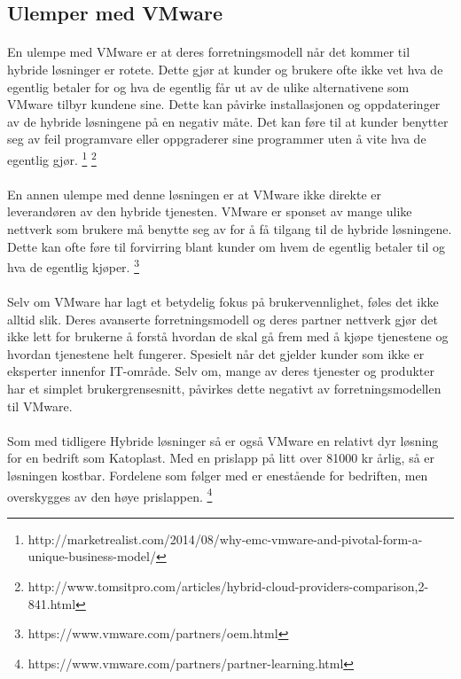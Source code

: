 \subsection{Ulemper med VMware}
\paragraph{} En ulempe med VMware er at deres forretningsmodell når det kommer til hybride løsninger er rotete. Dette gjør at kunder og brukere ofte ikke vet hva de egentlig betaler for og hva de egentlig får ut av de ulike alternativene som VMware tilbyr kundene sine. Dette kan påvirke installasjonen og oppdateringer av de hybride løsningene på en negativ måte. Det kan føre til at kunder benytter seg av feil programvare eller oppgraderer sine programmer uten å vite hva de egentlig gjør.
\footnote{http://marketrealist.com/2014/08/why-emc-vmware-and-pivotal-form-a-unique-business-model/}
\footnote{http://www.tomsitpro.com/articles/hybrid-cloud-providers-comparison,2-841.html}

\paragraph{} En annen ulempe med denne løsningen er at VMware ikke direkte er leverandøren av den hybride tjenesten. VMware er sponset av mange ulike nettverk som brukere må benytte seg av for å få tilgang til de hybride løsningene. Dette kan ofte føre til forvirring blant kunder om hvem de egentlig betaler til og hva de egentlig kjøper.
\footnote{https://www.vmware.com/partners/oem.html}

\paragraph{} Selv om VMware har lagt et betydelig fokus på brukervennlighet, føles det ikke alltid slik. Deres avanserte forretningsmodell og deres partner nettverk gjør det ikke lett for brukerne å forstå hvordan de skal gå frem med å kjøpe tjenestene og hvordan tjenestene helt fungerer. Spesielt når det gjelder kunder som ikke er eksperter innenfor IT-område. Selv om, mange av deres tjenester og produkter har et simplet brukergrensesnitt, påvirkes dette negativt av forretningsmodellen til VMware.

\paragraph{} Som med tidligere Hybride løsninger så er også VMware en relativt dyr løsning for en bedrift som Katoplast. Med en prislapp på litt over 81000 kr årlig, så er løsningen kostbar. Fordelene som følger med er enestående for bedriften, men overskygges av den høye prislappen.
\footnote{https://www.vmware.com/partners/partner-learning.html}

